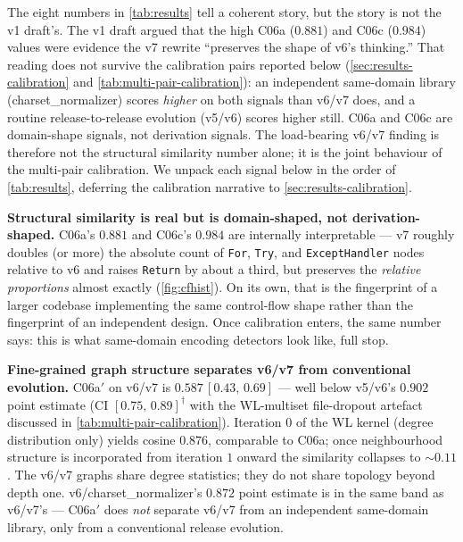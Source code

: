 \documentclass[11pt,letterpaper]{article}
\begin{document}
The eight numbers in \cref{tab:results} tell a coherent story, but
the story is not the v1 draft's. The v1 draft argued that the
high C06a ($0.881$) and C06c ($0.984$) values were evidence the
v7 rewrite ``preserves the shape of v6's thinking.'' That reading
does not survive the calibration pairs reported below
(\cref{sec:results-calibration} and \cref{tab:multi-pair-calibration}):
an independent same-domain library (charset\_normalizer) scores
\emph{higher} on both signals than v6/v7 does, and a routine
release-to-release evolution (v5/v6) scores higher still. C06a
and C06c are domain-shape signals, not derivation signals. The
load-bearing v6/v7 finding is therefore not the structural
similarity number alone; it is the joint behaviour of the
multi-pair calibration. We unpack each signal below in the order
of \cref{tab:results}, deferring the calibration narrative to
\cref{sec:results-calibration}.

\textbf{Structural similarity is real but is domain-shaped, not
derivation-shaped.} C06a's $0.881$ and C06c's $0.984$ are
internally interpretable --- v7 roughly doubles (or more) the
absolute count of \texttt{For}, \texttt{Try}, and
\texttt{ExceptHandler} nodes relative to v6 and raises
\texttt{Return} by about a third, but preserves the
\emph{relative proportions} almost exactly
(\cref{fig:cfhist}). On its own, that is the fingerprint of a
larger codebase implementing the same control-flow shape rather
than the fingerprint of an independent design. Once
calibration enters, the same number says: this is what
same-domain encoding detectors look like, full stop.

\textbf{Fine-grained graph structure separates v6/v7 from
conventional evolution.} C06a$'$ on v6/v7 is $0.587\,[0.43,\,0.69]$
--- well below v5/v6's $0.902$ point estimate (CI
$[0.75,\,0.89]^{\dagger}$ with the WL-multiset
file-dropout artefact discussed in \cref{tab:multi-pair-calibration}).
Iteration $0$ of the WL kernel (degree distribution only) yields
cosine $0.876$, comparable to C06a; once neighbourhood structure
is incorporated from iteration $1$ onward the similarity collapses
to $\sim 0.11$. The v6/v7 graphs share degree statistics; they do
not share topology beyond depth one. v6/charset\_normalizer's
$0.872$ point estimate is in the same band as v6/v7's --- C06a$'$
does \emph{not} separate v6/v7 from an independent same-domain
library, only from a conventional release evolution.
\end{document}
